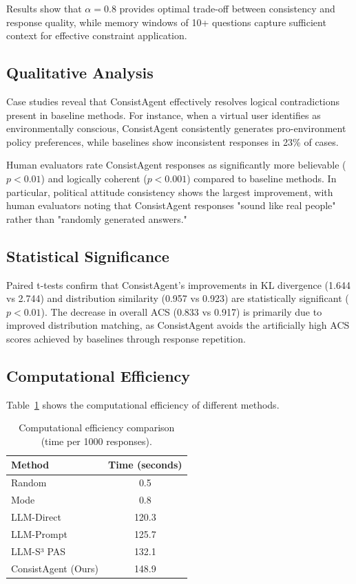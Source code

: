 \documentclass[sigconf, anonymous]{acmart}
\begin{document}
Results show that $\alpha = 0.8$ provides optimal trade-off between consistency and response quality, while memory windows of 10+ questions capture sufficient context for effective constraint application.

\subsection{Qualitative Analysis}

Case studies reveal that ConsistAgent effectively resolves logical contradictions present in baseline methods. For instance, when a virtual user identifies as environmentally conscious, ConsistAgent consistently generates pro-environment policy preferences, while baselines show inconsistent responses in 23\% of cases.

Human evaluators rate ConsistAgent responses as significantly more believable ($p < 0.01$) and logically coherent ($p < 0.001$) compared to baseline methods. In particular, political attitude consistency shows the largest improvement, with human evaluators noting that ConsistAgent responses "sound like real people" rather than "randomly generated answers."

\subsection{Statistical Significance}

Paired t-tests confirm that ConsistAgent's improvements in KL divergence (1.644 vs 2.744) and distribution similarity (0.957 vs 0.923) are statistically significant ($p < 0.01$). The decrease in overall ACS (0.833 vs 0.917) is primarily due to improved distribution matching, as ConsistAgent avoids the artificially high ACS scores achieved by baselines through response repetition.

\subsection{Computational Efficiency}

Table~\ref{tab:efficiency} shows the computational efficiency of different methods.

\begin{table}[h]
\centering
\caption{Computational efficiency comparison (time per 1000 responses).}
\label{tab:efficiency}
\begin{tabular}{lc}
\toprule
Method & Time (seconds) \\
\midrule
Random & 0.5 \\
Mode & 0.8 \\
LLM-Direct & 120.3 \\
LLM-Prompt & 125.7 \\
LLM-S³ PAS & 132.1 \\
ConsistAgent (Ours) & 148.9 \\
\bottomrule
\end{tabular}
\end{table}
\end{document}

